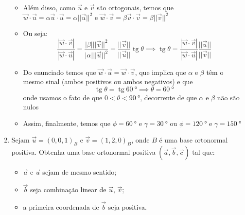 \documentclass[brazilian, fleqn]{article}
\DeclareMathOperator{\tg}{tg}
\renewcommand{\vec}[1]{\overrightarrow{#1}}
\begin{document}
\begin{enumerate}
\begin{tcolorbox}
            \begin{itemize}
                \item Além disso, como \(\vec{u}\) e \(\vec{v}\) são ortogonais, temos que
                    \(\vec{w} \cdot \vec{u} = \alpha \vec{u} \cdot \vec{u} = \alpha ||\vec{u}||^2\) e
                    \(\vec{w} \cdot \vec{v} = \beta \vec{v} \cdot \vec{v} = \beta ||\vec{v}||^2\)
                \item Ou seja:
                    \[
                        \frac{|\vec{w} \cdot \vec{v}|}{|\vec{w} \cdot \vec{u}|}=
                        \frac{|\beta|||\vec{v}||^2}{|\alpha| ||\vec{u}||^2}=
                        \frac{||\vec{v}||}{||\vec{u}||}\tg {\theta} \implies
                        \tg{\theta} =
                        \frac{|\vec{w} \cdot \vec{v}|}{|\vec{w} \cdot \vec{u}|}
                        \frac{||\vec{u}||}{||\vec{v}||}
                    \]
                \item Do enunciado temos que \(\vec{w} \cdot \vec{u} = \vec{w} \cdot \vec{v}\),
                    que implica que \(\alpha\) e \(\beta\) têm o mesmo sinal (ambos positivos ou ambos negativos)
                    e que
                    \[
                        \tg {\theta} = \tg{\SI{60}{\degree}} \implies \theta = \SI{60}{\degree}
                    \]
                    onde usamos o fato de que \(0 < \theta < \SI{90}{\degree}\), decorrente de que \(\alpha\) e \(\beta\) não são nulos
                \item Assim, finalmente, temos que \(\phi=\SI{60}{\degree}\) e \(\gamma=\SI{30}{\degree}\) ou
                    \(\phi=\SI{120}{\degree}\) e \(\gamma=\SI{150}{\degree}\)

            \end{itemize}
        \end{tcolorbox}

    \item Sejam \(\vec{u}=(0,0,1)_B\) e \(\vec{v}=(1,2,0)_B\), onde \(B\) é uma base ortonormal positiva. Obtenha uma base
        ortonormal positiva \((\vec{a}, \vec{b}, \vec{c})\) tal que:
        \begin{itemize}
            \item \(\vec{a}\) e \(\vec{u}\) sejam de mesmo sentido;
            \item \(\vec{b}\) seja combinação linear de \(\vec{u}\), \(\vec{v}\);
            \item a primeira coordenada de \(\vec{b}\) seja positiva.
        \end{itemize}


\end{enumerate}
\end{document}
